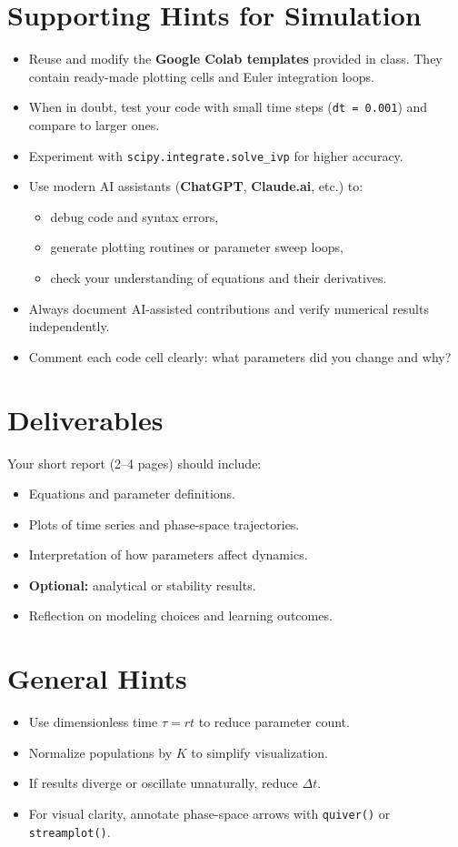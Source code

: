 \documentclass[11pt,a4paper]{article}
\begin{document}
\section{Supporting Hints for Simulation}
\begin{itemize}[leftmargin=*,itemsep=0.25em]
  \item Reuse and modify the \textbf{Google Colab templates} provided in class.  
        They contain ready-made plotting cells and Euler integration loops.
  \item When in doubt, test your code with small time steps (\texttt{dt = 0.001}) and compare to larger ones.
  \item Experiment with \texttt{scipy.integrate.solve\_ivp} for higher accuracy.
  \item Use modern AI assistants (\textbf{ChatGPT}, \textbf{Claude.ai}, etc.) to:
        \begin{itemize}
          \item debug code and syntax errors,
          \item generate plotting routines or parameter sweep loops,
          \item check your understanding of equations and their derivatives.
        \end{itemize}
  \item Always document AI-assisted contributions and verify numerical results independently.
  \item Comment each code cell clearly: what parameters did you change and why?
\end{itemize}

\section{Deliverables}
Your short report (2--4 pages) should include:
\begin{itemize}[leftmargin=*,itemsep=0.25em]
  \item Equations and parameter definitions.
  \item Plots of time series and phase-space trajectories.
  \item Interpretation of how parameters affect dynamics.
  \item \textbf{Optional:} analytical or stability results.
  \item Reflection on modeling choices and learning outcomes.
\end{itemize}

\section{General Hints}
\begin{itemize}[leftmargin=*,itemsep=0.25em]
  \item Use dimensionless time $\tau = r t$ to reduce parameter count.
  \item Normalize populations by $K$ to simplify visualization.
  \item If results diverge or oscillate unnaturally, reduce $\Delta t$.
  \item For visual clarity, annotate phase-space arrows with \texttt{quiver()} or \texttt{streamplot()}.
\end{itemize}
\end{document}
